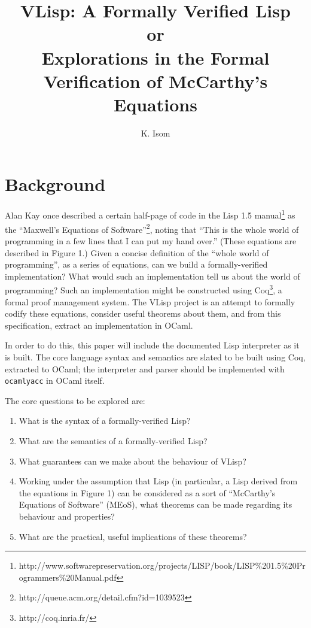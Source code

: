 \documentclass[10pt]{article}
\title {VLisp: A Formally Verified Lisp\\or\\Explorations in the Formal Verification of McCarthy's Equations}
\author{K. Isom}
\begin{document}
\maketitle

\section{Background}

Alan Kay once described a certain half-page of code in the Lisp 1.5
manual\footnote{http://www.softwarepreservation.org/projects/LISP/book/LISP\%201.5\%20Programmers\%20Manual.pdf}
as the ``Maxwell's Equations of
Software''\footnote{http://queue.acm.org/detail.cfm?id=1039523},
noting that ``This is the whole world of programming in a few lines
that I can put my hand over.'' (These equations are described in
Figure 1.) Given a concise definition of the ``whole world of
programming'', as a series of equations, can we build a
formally-verified implementation? What would such an implementation
tell us about the world of programming? Such an implementation might
be constructed using Coq\footnote{http://coq.inria.fr/}, a formal
proof management system. The VLisp project is an attempt to formally
codify these equations, consider useful theorems about them, and from
this specification, extract an implementation in OCaml.

In order to do this, this paper will include the documented Lisp
interpreter as it is built. The core language syntax and semantics are
slated to be built using Coq, extracted to OCaml; the interpreter and
parser should be implemented with \verb|ocamlyacc| in OCaml itself.

The core questions to be explored are:

\begin{enumerate}
  \item What is the syntax of a formally-verified Lisp?
  \item What are the semantics of a formally-verified Lisp?
  \item What guarantees can we make about the behaviour of VLisp?
  \item Working under the assumption that Lisp (in particular, a Lisp
    derived from the equations in Figure 1) can be considered as a
    sort of ``McCarthy's Equations of Software'' (MEoS), what theorems
    can be made regarding its behaviour and properties?
  \item What are the practical, useful implications of these theorems?
\end{enumerate}
\end{document}
